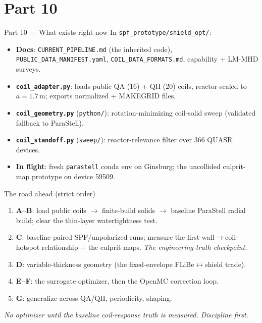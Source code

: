 \documentclass[11pt,aspectratio=169]{beamer}
\newcommand{\key}[1]{\textcolor{key}{\textbf{#1}}}
\newcommand{\qq}[1]{\begin{center}\emph{#1}\end{center}}
\begin{document}
\section{Part 10}
\begin{frame}{Part 10 --- What exists right now}
In \texttt{spf\_prototype/shield\_opt/}:
\begin{itemize}\footnotesize
\item \key{Docs}: \texttt{CURRENT\_PIPELINE.md} (the inherited code), \texttt{PUBLIC\_DATA\_MANIFEST.yaml},
      \texttt{COIL\_DATA\_FORMATS.md}, capability + LM-MHD surveys.
\item \key{\texttt{coil\_adapter.py}}: loads public QA (16) + QH (20) coils, reactor-scaled to
      \(a=1.7\,\text{m}\); exports normalized + MAKEGRID files.
\item \key{\texttt{coil\_geometry.py}} (\texttt{python/}): rotation-minimizing coil-solid sweep
      (validated fallback to ParaStell).
\item \key{\texttt{coil\_standoff.py}} (\texttt{sweep/}): reactor-relevance filter over 366 QUASR
      devices.
\item \key{In flight}: fresh \texttt{parastell} conda env on Ginsburg; the uncollided
      culprit-map prototype on device 59509.
\end{itemize}
\end{frame}

\begin{frame}{The road ahead (strict order)}
\begin{enumerate}\footnotesize
\item \key{A--B}: load public coils $\to$ finite-build solids $\to$ baseline ParaStell radial
      build; clear the thin-layer watertightness test.
\item \key{C}: baseline paired SPF/unpolarized runs; measure the first-wall$\to$coil-hotspot
      relationship + the culprit maps. \emph{The engineering-truth checkpoint.}
\item \key{D}: variable-thickness geometry (the fixed-envelope FLiBe$\leftrightarrow$shield trade).
\item \key{E--F}: the surrogate optimizer, then the OpenMC correction loop.
\item \key{G}: generalize across QA/QH, periodicity, shaping.
\end{enumerate}
\qq{No optimizer until the baseline coil-response truth is measured. Discipline first.}
\end{frame}
\end{document}
